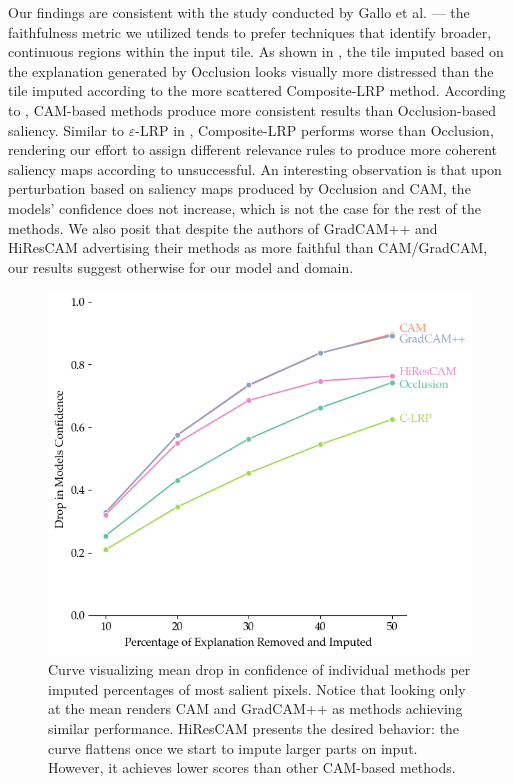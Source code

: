 Our findings are consistent with the study conducted by Gallo et al. \cite{gallo} --- the faithfulness metric we utilized tends to prefer techniques that identify broader, continuous regions within the input tile.
As shown in , the tile imputed based on the explanation generated by Occlusion looks visually more distressed than the tile imputed according to the more scattered Composite-LRP method.
According to , CAM-based methods produce more consistent results than Occlusion-based saliency.
Similar to $\varepsilon$-LRP in \cite{gallo}, Composite-LRP performs worse than Occlusion, rendering our effort to assign different relevance rules to produce more coherent saliency maps according to \cite{lrp, lrp-alpha-beta} unsuccessful.
An interesting observation is that upon perturbation based on saliency maps produced by Occlusion and CAM, the models' confidence does not increase, which is not the case for the rest of the methods.
We also posit that despite the authors of GradCAM++ and HiResCAM \cite{grad-cam, hires-cam} advertising their methods as more faithful than CAM/GradCAM, our results suggest otherwise for our model and domain.

\begin{figure}
    \begin{center}
    \begin{minipage}{0.7\textwidth}
      \includegraphics[width=\textwidth]{img/road-curve.png}
    \end{minipage}
    \caption{Curve visualizing mean drop in confidence of individual methods per imputed percentages of most salient pixels. Notice that looking only at the mean renders CAM and GradCAM++ as methods achieving similar performance. HiResCAM presents the desired behavior: the curve flattens once we start to impute larger parts on input. However, it achieves lower scores than other CAM-based methods.}
    \label{fig:road-curve}
    \end{center}
\end{figure}

